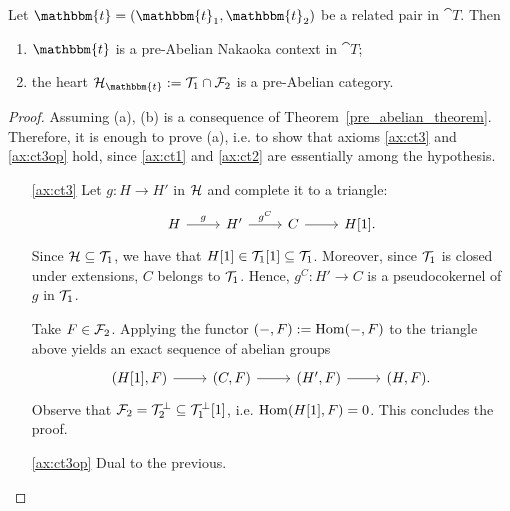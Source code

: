 \begin{prop}\label{prop:2.5}
  Let $\mathbbm{t}=(\mathbbm{t}_1,\mathbbm{t}_2)$ be a related pair in $\cat{T}$. Then
  \begin{enumerate}[label=(\alph*)]
    \item\label{prop:2.5:b} $\mathbbm{t}$ is a pre-Abelian Nakaoka context in $\cat{T}$;
    \item the heart $\mathcal{H}_\mathbbm{t} := \mathcal{T}_1\cap\mathcal{F}_2$ is a pre-Abelian category.
  \end{enumerate}
\end{prop}

\begin{proof}
  Assuming (a), (b) is a consequence of Theorem~\ref{pre_abelian_theorem}. Therefore, it is enough to prove (a), i.e. to show that axioms \ref{ax:ct3} and \ref{ax:ct3op} hold, since \ref{ax:ct1} and \ref{ax:ct2} are essentially among the hypothesis.

  \begin{itemize}
    \item[\ref{ax:ct3}] Let $g:H\to H'$ in $\mathcal{H}$ and complete it to a triangle:
      \begin{equation*}
        \begin{tikzcd}
          H\arrow{r}{g}&H'\arrow{r}{g^C}&C\arrow{r}&H[1].
        \end{tikzcd}
      \end{equation*}
      Since $\mathcal{H}\subseteq \mathcal{T}_1$, we have that $H[1]\in\mathcal{T}_1[1]\subseteq \mathcal{T}_1$. Moreover, since $\mathcal{T}_1$ is closed under extensions, $C$ belongs to $\mathcal{T}_1$. Hence, $g^C:H'\to C$ is a pseudocokernel of $g$ in $\mathcal{T}_1$.

      Take $F\in\mathcal{F}_2$. Applying the functor $(-,F):=\operatorname{Hom}(-,F)$ to the triangle above yields an exact sequence of abelian groups
      \begin{equation*}
        \begin{tikzcd}
          (H[1],F)\arrow{r}&(C,F)\arrow{r}&(H',F)\arrow{r}&(H,F).
        \end{tikzcd}
      \end{equation*}
      Observe that $\mathcal{F}_2=\mathcal{T}_2^\perp \subseteq \mathcal{T}_1^\perp[1]$, i.e. $\operatorname{Hom}(H[1],F)=0$. This concludes the proof.
    \item[\ref{ax:ct3op}] Dual to the previous.
  \end{itemize}
\end{proof}

